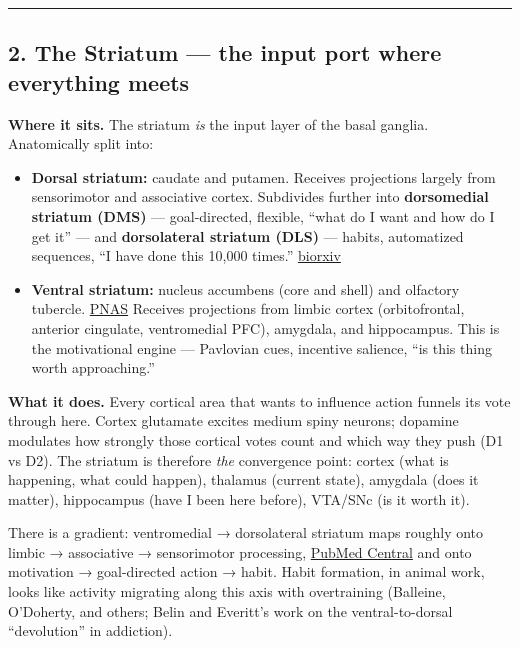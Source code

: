 \begin{center}\rule{0.5\linewidth}{0.5pt}\end{center}

\subsection{2. The Striatum --- the input port where everything meets}\label{06_neurology_101-the-striatum-the-input-port-where-everything-meets}

\textbf{Where it sits.} The striatum \emph{is} the input layer of the basal ganglia. Anatomically split into:

\begin{itemize}
\tightlist
\item
  \textbf{Dorsal striatum:} caudate and putamen. Receives projections largely from sensorimotor and associative cortex. Subdivides further into \textbf{dorsomedial striatum (DMS)} --- goal-directed, flexible, ``what do I want and how do I get it'' --- and \textbf{dorsolateral striatum (DLS)} --- habits, automatized sequences, ``I have done this 10,000 times.'' \href{https://www.biorxiv.org/content/10.1101/2021.04.03.438314.full.pdf}{biorxiv}
\item
  \textbf{Ventral striatum:} nucleus accumbens (core and shell) and olfactory tubercle. \href{https://www.pnas.org/doi/10.1073/pnas.1921007117}{PNAS} Receives projections from limbic cortex (orbitofrontal, anterior cingulate, ventromedial PFC), amygdala, and hippocampus. This is the motivational engine --- Pavlovian cues, incentive salience, ``is this thing worth approaching.''
\end{itemize}

\textbf{What it does.} Every cortical area that wants to influence action funnels its vote through here. Cortex glutamate excites medium spiny neurons; dopamine modulates how strongly those cortical votes count and which way they push (D1 vs D2). The striatum is therefore \emph{the} convergence point: cortex (what is happening, what could happen), thalamus (current state), amygdala (does it matter), hippocampus (have I been here before), VTA/SNc (is it worth it).

There is a gradient: ventromedial → dorsolateral striatum maps roughly onto limbic → associative → sensorimotor processing, \href{https://pmc.ncbi.nlm.nih.gov/articles/PMC4240773/}{PubMed Central} and onto motivation → goal-directed action → habit. Habit formation, in animal work, looks like activity migrating along this axis with overtraining (Balleine, O'Doherty, and others; Belin and Everitt's work on the ventral-to-dorsal ``devolution'' in addiction).

